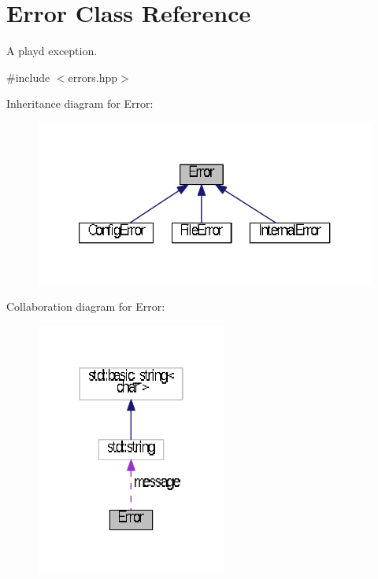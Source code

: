 \hypertarget{classError}{\section{Error Class Reference}
\label{classError}
}


A playd exception.  




{\ttfamily \#include $<$errors.\+hpp$>$}



Inheritance diagram for Error\+:
\nopagebreak
\begin{figure}[H]
\begin{center}
\leavevmode
\includegraphics[width=321pt]{classError__inherit__graph}
\end{center}
\end{figure}


Collaboration diagram for Error\+:
\nopagebreak
\begin{figure}[H]
\begin{center}
\leavevmode
\includegraphics[width=178pt]{classError__coll__graph}
\end{center}
\end{figure}
